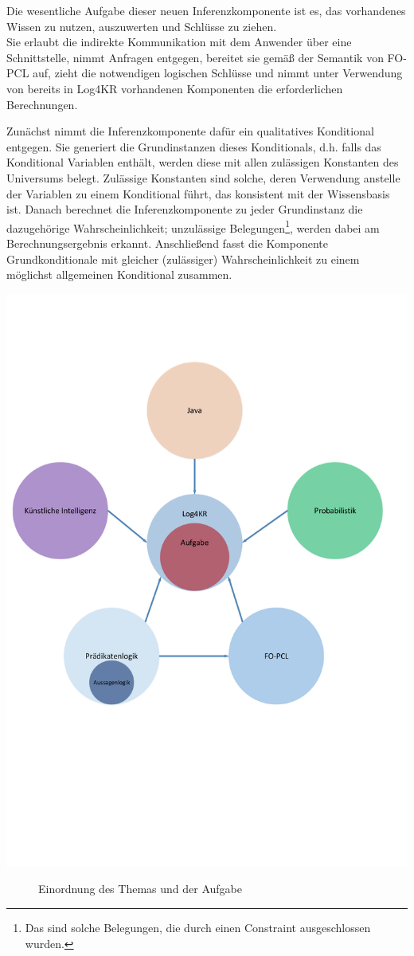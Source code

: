 \documentclass[a4paper, 11pt]{book}
\begin{document}
Die wesentliche Aufgabe dieser neuen Inferenzkomponente ist es, das vorhandenes Wissen zu nutzen, auszuwerten und Schlüsse zu ziehen.\\
Sie erlaubt die indirekte Kommunikation mit dem Anwender über eine Schnittstelle, nimmt Anfragen entgegen, bereitet sie gemäß der Semantik von FO-PCL auf, zieht die notwendigen logischen Schlüsse und nimmt unter Verwendung von bereits in Log4KR vorhandenen Komponenten die erforderlichen Berechnungen.
 
Zunächst nimmt die Inferenzkomponente dafür ein qualitatives Konditional entgegen. Sie generiert die Grundinstanzen  dieses Konditionals, d.h. falls das Konditional Variablen enthält, werden diese mit allen zulässigen Konstanten des Universums belegt. Zulässige Konstanten sind solche, deren Verwendung anstelle der Variablen zu einem Konditional führt, das konsistent mit der Wissensbasis ist. Danach berechnet die Inferenzkomponente zu jeder Grundinstanz die dazugehörige Wahrscheinlichkeit; unzulässige Belegungen\footnote{Das sind solche Belegungen, die durch einen Constraint ausgeschlossen wurden.}, werden dabei am Berechnungsergebnis erkannt. Anschließend fasst die Komponente Grundkonditionale mit gleicher (zulässiger) Wahrscheinlichkeit zu einem möglichst allgemeinen Konditional zusammen.

\includegraphics[scale = 0.3]{Graphics/Eingangsbild}
\begin{figure}[h]
	\caption{Einordnung des Themas und der Aufgabe}
	\label{Eingangsgrafik}
\end{figure}
\newpage
\end{document}
